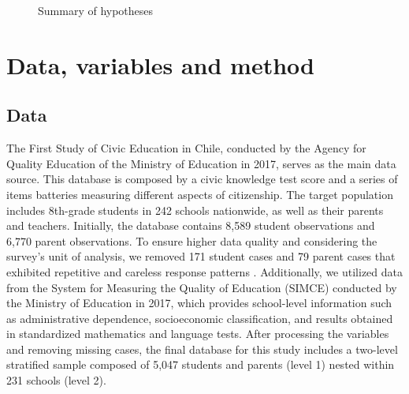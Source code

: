 \documentclass[
    behavsci,
    article,
    submit,
moreauthors
]{mdpi}
\begin{document}
\begin{figure}


\caption{\label{fig-hypotheses}Summary of hypotheses}

\end{figure}%

\section{Data, variables and method}\label{data-variables-and-method}

\subsection{Data}\label{data}

The First Study of Civic Education in Chile, conducted by the Agency for
Quality Education of the Ministry of Education in 2017, serves as the
main data source. This database is composed by a civic knowledge test
score and a series of items batteries measuring different aspects of
citizenship. The target population includes 8th-grade students in 242
schools nationwide, as well as their parents and teachers. Initially,
the database contains 8,589 student observations and 6,770 parent
observations. To ensure higher data quality and considering the survey's
unit of analysis, we removed 171 student cases and 79 parent cases that
exhibited repetitive and careless response patterns
\citep{gottfried_autocorrelation_2022}. Additionally, we utilized data
from the System for Measuring the Quality of Education (SIMCE) conducted
by the Ministry of Education in 2017, which provides school-level
information such as administrative dependence, socioeconomic
classification, and results obtained in standardized mathematics and
language tests. After processing the variables and removing missing
cases, the final database for this study includes a two-level stratified
sample composed of 5,047 students and parents (level 1) nested within
231 schools (level 2).
\end{document}
